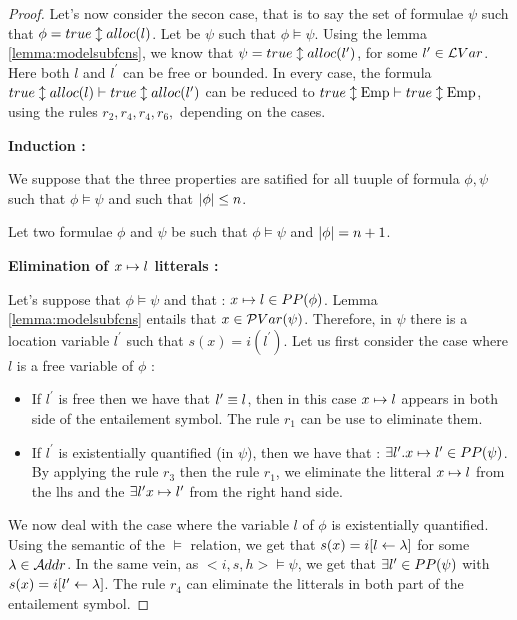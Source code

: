 \begin{proof}
Let's now consider the secon case, that is to say the set of formulae $\psi$ such that $\phi=true \updownarrow alloc(l)$. Let be $\psi$ such that $ \phi \models \psi$. Using the lemma  \ref{lemma:modelsubfcns}, we know that $\psi=true \updownarrow alloc(l^{\prime})$, for some $l^{\prime} \in \mathcal{L}Var$.
Here both $l$ and $l^{\prime}$  can be free or bounded. In every case, the formula
$true \updownarrow alloc(l) \vdash true \updownarrow alloc(l^{\prime})$ 
can be reduced to $\Formula{\true}{\Emp} \vdash \Formula{\true}{\Emp}$, using 
the rules $r_2,r_4,r_4,r_6,$ depending on the cases.  


\textbf{Induction :}

We suppose that the three properties are satified for all tuuple of formula $\phi, \psi$ such that $\phi \models \psi$ and such that $|{\phi}|\leq n$.

Let  two formulae $\phi$ and $\psi$ be such that $\phi \models \psi$ and
 $|{\phi}|=n+1$.

\textbf{Elimination of $x \mapsto l$ litterals :}

Let's suppose that $\phi \models \psi$ and that : $x \mapsto l\in PP(\phi)$.
Lemma \ref{lemma:modelsubfcns} entails that $x\in \mathcal{P}Var(\psi)$. 
Therefore, in $\psi$ there is a location variable $l^{\prime}$ such that $s(x)=i(l^{\prime})$. 
Let us first consider the case where $l$ is a free variable of $\phi$ :

\begin{itemize}
\item If $l^{\prime}$ is free then we have that $l^{\prime}\equiv l$, then in this case $x \mapsto l$ appears in both side of the entailement symbol. The rule $r_1$ can be use to eliminate them.
\item If $l^{\prime}$ is existentially quantified (in $\psi$), then we have that : $\exists l^{\prime}. x \mapsto l^{\prime}\in PP(\psi)$. By applying the rule $r_3$ then the rule $r_1$, we eliminate the litteral $x \mapsto l$ from
the lhs and the $\exists l^{\prime} x \mapsto l^{\prime}$ from the right hand side.
\end{itemize}

We now deal with the case where the variable $l$ of $\phi$ is existentially quantified. Using the semantic of the $\models$ relation, we get that $s(x)=i\lbrack l \gets \lambda \rbrack$ for some $\lambda \in \mathcal{A}ddr$. In the same vein, as $<i,s,h> \models \psi$, we get that $\exists l^{\prime}\in PP(\psi)$ with $s(x)=i\lbrack l^{\prime} \gets \lambda \rbrack$.
 The rule $r_4$ can eliminate the litterals in both part of the entailement symbol.


\end{proof}
